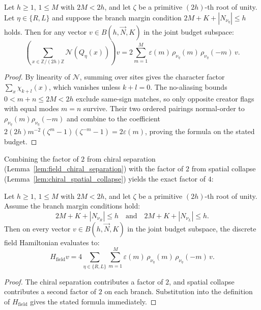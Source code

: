\begin{lemma}
\label{lem:chiral_spatial_collapse}
Let $h \ge 1$, $1 \le M$ with $2M < 2h$, and let $\zeta$ be a primitive $(2h)$-th root of unity. Let $\eta \in \{R, L\}$ and suppose the branch margin condition $2M + K + |N_{\nu_\eta}| \le h$ holds. Then for any vector $v \in B(h, \vec{N}, K)$ in the joint budget subspace:
\begin{equation}
\left( \sum_{x \in \mathbb{Z}/(2h)\mathbb{Z}} \mathcal{N}(Q_\eta(x)) \right) v = 2 \sum_{m=1}^M \varepsilon(m)\, \rho_{\nu_\eta}(m)\, \rho_{\nu_\eta}(-m)\, v.
\end{equation}
\end{lemma}

\begin{proof}
By linearity of $\mathcal{N}$, summing over sites gives the character factor $\sum_x\chi_{k+l}(x)$, which vanishes unless $k+l=0$. The no-aliasing bounds $0<m+n\le2M<2h$ exclude same-sign matches, so only opposite creator flags with equal modes $m=n$ survive. Their two ordered pairings normal-order to $\rho_{\nu_\eta}(m)\rho_{\nu_\eta}(-m)$ and combine to the coefficient $2(2h)m^{-2}(\zeta^m-1)(\zeta^{-m}-1)=2\varepsilon(m)$, proving the formula on the stated budget.
\end{proof}

Combining the factor of $2$ from chiral separation (Lemma~\ref{lem:field_chiral_separation}) with the factor of $2$ from spatial collapse (Lemma~\ref{lem:chiral_spatial_collapse}) yields the exact factor of $4$:

\begin{theorem}
\label{thm:field_weighted_energy}
Let $h \ge 1$, $1 \le M$ with $2M < 2h$, and let $\zeta$ be a primitive $(2h)$-th root of unity. Assume the branch margin conditions hold:
\begin{equation}
2M + K + |N_{\nu_R}| \le h \quad \text{and} \quad 2M + K + |N_{\nu_L}| \le h.
\end{equation}
Then on every vector $v \in B(h, \vec{N}, K)$ in the joint budget subspace, the discrete field Hamiltonian evaluates to:
\begin{equation}
H_{\mathrm{field}} v = 4 \sum_{\eta \in \{R, L\}} \sum_{m=1}^M \varepsilon(m)\, \rho_{\nu_\eta}(m)\, \rho_{\nu_\eta}(-m)\, v.
\end{equation}
\end{theorem}

\begin{proof}
The chiral separation contributes a factor of $2$, and spatial collapse contributes a second factor of $2$ on each branch. Substitution into the definition of $H_{\mathrm{field}}$ gives the stated formula immediately.
\end{proof}

